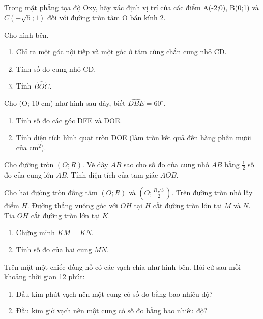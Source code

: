 \documentclass[%
    fontsize=12pt,%
    chapterprefix=false,%
    open=right,%
    twoside=false,%
    numbers=noenddot,%
    headings=optiontohead,%
    final,%
    DIV=15,%
    parskip=half %
]{scrbook}
\begin{document}
\begin{tuluan}

\item Trong mặt phẳng tọa độ Oxy, hãy xác định vị trí của các điểm A(-2;0), B(0;1) và $ C(-\sqrt{5};1) $ đối với đường tròn tâm O bán kính 2.

\item Cho hình bên.
\begin{enumerate}[label=\alph*)]
  \item[a)] Chỉ ra một góc nội tiếp và một góc ở tâm cùng chắn cung nhỏ CD.
  \item[b)] Tính số đo cung nhỏ CD.
  \item[c)] Tính $ \widehat{BOC} $.
\end{enumerate}

\item Cho (O; 10 cm) như hình sau đây, biết $ \widehat{DBE} = 60^\circ $.
\begin{enumerate}[label=\alph*)]
  \item[a)] Tính số đo các góc DFE và DOE.
  \item[b)] Tính diện tích hình quạt tròn DOE (làm tròn kết quả đến hàng phần mươi của $ \mathrm{cm}^2 $).
\end{enumerate}

\item Cho đường tròn $(O; R)$. Vẽ dây $AB$ sao cho số đo của cung nhỏ $AB$ bằng $\frac{1}{2}$ số đo của cung lớn $AB$. Tính diện tích của tam giác $AOB$.

\item Cho hai đường tròn đồng tâm $(O; R)$ và $\left(O; \frac{R\sqrt{3}}{2}\right)$. Trên đường tròn nhỏ lấy điểm $H$. Đường thẳng vuông góc với $OH$ tại $H$ cắt đường tròn lớn tại $M$ và $N$. Tia $OH$ cắt đường tròn lớn tại $K$.
\begin{enumerate}[label=\alph*)]
  \item[a)] Chứng minh $\overline{KM} = \overline{KN}$.
  \item[b)] Tính số đo của hai cung $MN$.
\end{enumerate}

\item Trên mặt một chiếc đồng hồ có các vạch chia như hình bên. Hỏi cứ sau mỗi khoảng thời gian 12 phút:
\begin{enumerate}[label=\alph*)]
  \item[a)] Đầu kim phút vạch nên một cung có số đo bằng bao nhiêu độ?
  \item[b)] Đầu kim giờ vạch nên một cung có số đo bằng bao nhiêu độ?
\end{enumerate}


\end{tuluan}
\end{document}
